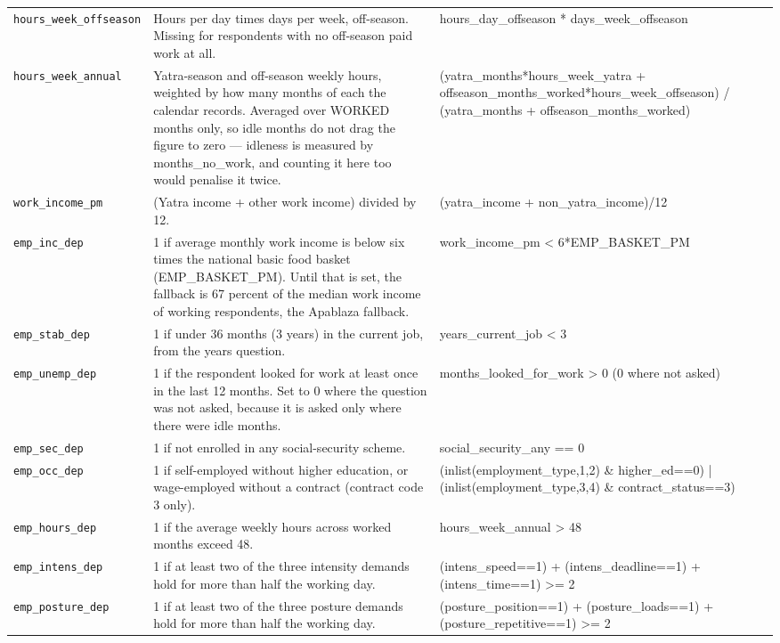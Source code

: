\documentclass[10pt]{article}
\begin{document}
{\begin{longtable}{p{3.3cm}p{7.6cm}p{5.7cm}}
\texttt{hours\_week\_offseason} & Hours per day times days per week, off-season. Missing for respondents with no off-season paid work at all. & hours\_day\_offseason * days\_week\_offseason \\
\texttt{hours\_week\_annual} & Yatra-season and off-season weekly hours, weighted by how many months of each the calendar records. Averaged over WORKED months only, so idle months do not drag the figure to zero — idleness is measured by months\_no\_work, and counting it here too would penalise it twice. & (yatra\_months*hours\_week\_yatra + offseason\_months\_worked*hours\_week\_offseason) / (yatra\_months + offseason\_months\_worked) \\
\texttt{work\_income\_pm} & (Yatra income + other work income) divided by 12. & (yatra\_income + non\_yatra\_income)/12 \\
\texttt{emp\_inc\_dep} & 1 if average monthly work income is below six times the national basic food basket (EMP\_BASKET\_PM). Until that is set, the fallback is 67 percent of the median work income of working respondents, the Apablaza fallback. & work\_income\_pm < 6*EMP\_BASKET\_PM \\
\texttt{emp\_stab\_dep} & 1 if under 36 months (3 years) in the current job, from the years question. & years\_current\_job < 3 \\
\texttt{emp\_unemp\_dep} & 1 if the respondent looked for work at least once in the last 12 months. Set to 0 where the question was not asked, because it is asked only where there were idle months. & months\_looked\_for\_work > 0 (0 where not asked) \\
\texttt{emp\_sec\_dep} & 1 if not enrolled in any social-security scheme. & social\_security\_any == 0 \\
\texttt{emp\_occ\_dep} & 1 if self-employed without higher education, or wage-employed without a contract (contract code 3 only). & (inlist(employment\_type,1,2) \& higher\_ed==0) | (inlist(employment\_type,3,4) \& contract\_status==3) \\
\texttt{emp\_hours\_dep} & 1 if the average weekly hours across worked months exceed 48. & hours\_week\_annual > 48 \\
\texttt{emp\_intens\_dep} & 1 if at least two of the three intensity demands hold for more than half the working day. & (intens\_speed==1) + (intens\_deadline==1) + (intens\_time==1) >= 2 \\
\texttt{emp\_posture\_dep} & 1 if at least two of the three posture demands hold for more than half the working day. & (posture\_position==1) + (posture\_loads==1) + (posture\_repetitive==1) >= 2 \\

\end{longtable}}
\end{document}
